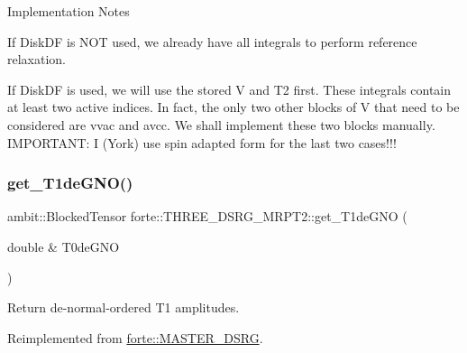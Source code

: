 Implementation Notes


\begin{DoxyEnumerate}
\item If Disk\+DF is N\+OT used, we already have all integrals to perform reference relaxation.
\item If Disk\+DF is used, we will use the stored V and T2 first. These integrals contain at least two active indices. In fact, the only two other blocks of V that need to be considered are vvac and avcc. We shall implement these two blocks manually. I\+M\+P\+O\+R\+T\+A\+NT\+: I (York) use spin adapted form for the last two cases!!!
\end{DoxyEnumerate}\mbox{\label{classforte_1_1_t_h_r_e_e___d_s_r_g___m_r_p_t2_a287c2ec19c2d42cce0cdc08133e43789}} 
\subsubsection{\texorpdfstring{get\+\_\+\+T1de\+G\+N\+O()}{get\_T1deGNO()}}
{\footnotesize\ttfamily ambit\+::\+Blocked\+Tensor forte\+::\+T\+H\+R\+E\+E\+\_\+\+D\+S\+R\+G\+\_\+\+M\+R\+P\+T2\+::get\+\_\+\+T1de\+G\+NO (\begin{DoxyParamCaption}\item[{double \&}]{T0de\+G\+NO }\end{DoxyParamCaption})\hspace{0.3cm}{\ttfamily [virtual]}}



Return de-\/normal-\/ordered T1 amplitudes. 



Reimplemented from \mbox{\hyperlink{classforte_1_1_m_a_s_t_e_r___d_s_r_g_a7eef5849acfd3aec1a2fbc5f981a5538}{forte\+::\+M\+A\+S\+T\+E\+R\+\_\+\+D\+S\+RG}}.

\mbox{\label{classforte_1_1_t_h_r_e_e___d_s_r_g___m_r_p_t2_ab6313c66e40f8b599c323bf3077a827f}} 
